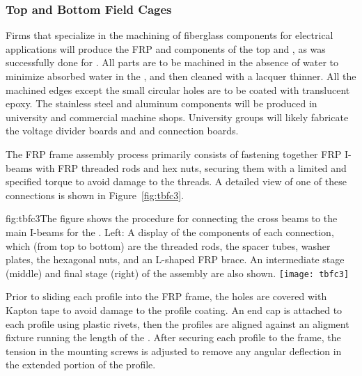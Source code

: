 
\subsubsection{Top and Bottom Field Cages}

Firms that specialize in the machining of fiberglass components for electrical applications will produce the FRP and \frfour components of the top and , as was successfully done for . All parts are to be machined in the absence of water to minimize absorbed water in the , and then cleaned with a lacquer thinner. 
All the machined edges except the small circular holes are to be coated with translucent epoxy. The stainless steel and aluminum components will be produced in university and commercial machine shops. University groups will likely fabricate the voltage divider boards and  and  connection boards.

The FRP frame assembly process primarily consists of fastening together FRP I-beams with FRP threaded rods and hex nuts,  securing them with a limited and specified torque to avoid damage to the threads. A detailed view of one of these connections is shown in Figure~\ref{fig:tbfc3}.

\begin{dunefigure}{fig:tbfc3}{The figure shows the procedure for connecting the cross beams to the main I-beams for the . Left: A display of the components of each connection, which (from top to bottom) are the threaded rods, the spacer tubes, washer plates, the hexagonal nuts, and an L-shaped FRP brace. An intermediate stage (middle) and final stage (right) of the assembly are also shown.}
\texttt{[image: tbfc3]}
\end{dunefigure}

Prior to sliding each profile into the FRP frame, the holes %
are covered with Kapton tape to avoid damage to the profile coating. An end cap is attached to each profile using plastic rivets, then the profiles are aligned against an aligment fixture running the length of the . After securing each profile to the frame, the tension in the mounting screws is adjusted to remove any angular deflection in the extended portion of the profile.

